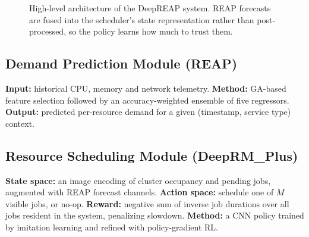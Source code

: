 \documentclass[runningheads]{llncs}
\begin{document}
\begin{figure}[t]
\centering
{}
\caption{High-level architecture of the DeepREAP system. REAP
forecasts are fused into the scheduler's state representation rather
than post-processed, so the policy learns how much to trust them.}
\label{fig:arch}
\end{figure}

\subsection{Demand Prediction Module (REAP)}

\textbf{Input:} historical CPU, memory and network telemetry.
\textbf{Method:} GA-based feature selection followed by an
accuracy-weighted ensemble of five regressors.
\textbf{Output:} predicted per-resource demand for a given
(timestamp, service type) context.

\subsection{Resource Scheduling Module (DeepRM\_Plus)}

\textbf{State space:} an image encoding of cluster occupancy and
pending jobs, augmented with REAP forecast channels.
\textbf{Action space:} schedule one of $M$ visible jobs, or no-op.
\textbf{Reward:} negative sum of inverse job durations over all jobs
resident in the system, penalizing slowdown.
\textbf{Method:} a CNN policy trained by imitation learning and
refined with policy-gradient RL.
\end{document}
